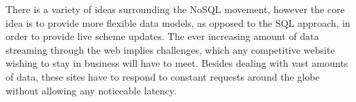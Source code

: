 
There is a variety of ideas surrounding the NoSQL movement, however the core idea is to provide more flexible data models, as opposed to the SQL approach, in order to provide live scheme updates. The ever increasing amount of data streaming through the web implies challenges, which any competitive website wishing to stay in business will have to meet. Besides dealing with vast amounts of data, these sites have to respond to constant requests around the globe without allowing any noticeable latency.

